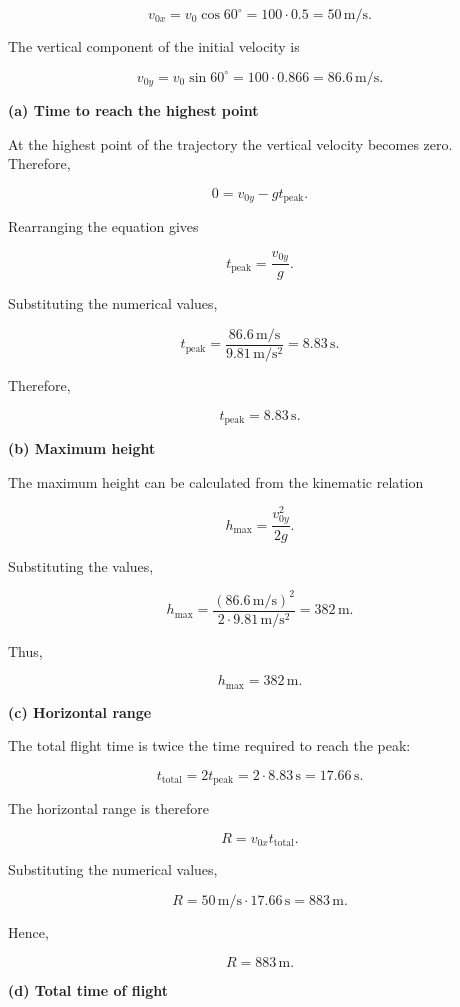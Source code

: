 \documentclass[letterpaper,12pt]{letter}
\begin{document}
\begin{enumerate}[label=\Roman*.]
\begin{enumerate}[label=\arabic*.]
$$v_{0x}=v_0\cos60^\circ=100\cdot0.5=50\,\mathrm{m/s}.$$

The vertical component of the initial velocity is

$$v_{0y}=v_0\sin60^\circ=100\cdot0.866=86.6\,\mathrm{m/s}.$$

\bigskip

\textbf{(a) Time to reach the highest point}

At the highest point of the trajectory the vertical velocity becomes zero. Therefore,

$$0=v_{0y}-gt_{\mathrm{peak}}.$$

Rearranging the equation gives

$$t_{\mathrm{peak}}=\frac{v_{0y}}{g}.$$

Substituting the numerical values,

$$t_{\mathrm{peak}}=\frac{86.6\,\mathrm{m/s}}{9.81\,\mathrm{m/s^2}}=8.83\,\mathrm{s}.$$

Therefore,

$$\boxed{t_{\mathrm{peak}}=8.83\,\mathrm{s}}.$$

\bigskip

\textbf{(b) Maximum height}

The maximum height can be calculated from the kinematic relation

$$h_{\max}=\frac{v_{0y}^2}{2g}.$$

Substituting the values,

$$h_{\max}=\frac{(86.6\,\mathrm{m/s})^2}{2\cdot9.81\,\mathrm{m/s^2}}=382\,\mathrm{m}.$$

Thus,

$$\boxed{h_{\max}=382\,\mathrm{m}}.$$

\bigskip

\textbf{(c) Horizontal range}

The total flight time is twice the time required to reach the peak:

$$t_{\mathrm{total}}=2t_{\mathrm{peak}}=2\cdot8.83\,\mathrm{s}=17.66\,\mathrm{s}.$$

The horizontal range is therefore

$$R=v_{0x}t_{\mathrm{total}}.$$

Substituting the numerical values,

$$R=50\,\mathrm{m/s}\cdot17.66\,\mathrm{s}=883\,\mathrm{m}.$$

Hence,

$$\boxed{R=883\,\mathrm{m}}.$$

\bigskip
\pagebreak
\textbf{(d) Total time of flight}


\end{enumerate}
\end{enumerate}
\end{document}
